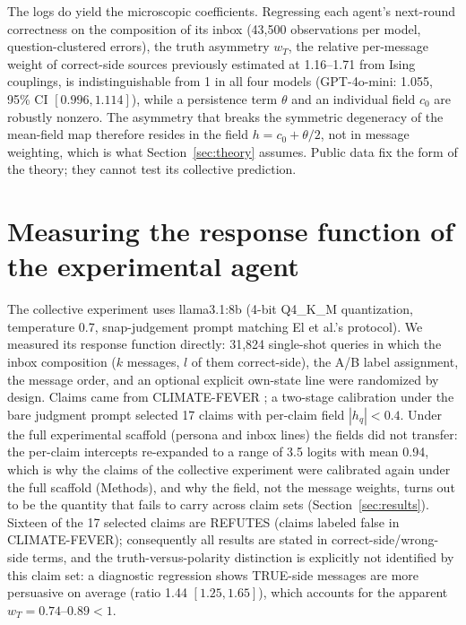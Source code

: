 \documentclass[11pt]{article}
\begin{document}
The logs do yield the microscopic coefficients. Regressing each agent's
next-round correctness on the composition of its inbox (43{,}500 observations
per model, question-clustered errors), the truth asymmetry $w_T$, the
relative per-message weight of correct-side sources previously estimated at
1.16--1.71 from Ising couplings, is indistinguishable from 1 in all four
models (GPT-4o-mini: 1.055, 95\% CI $[0.996, 1.114]$), while a persistence
term $\theta$ and an individual field $c_0$ are robustly nonzero. The
asymmetry that breaks the symmetric degeneracy of the mean-field map
therefore resides in the field $h = c_0 + \theta/2$, not in message
weighting, which is what Section~\ref{sec:theory} assumes. Public data fix
the form of the theory; they cannot test its collective prediction.

\section{Measuring the response function of the experimental agent}
\label{sec:measurement}

The collective experiment uses llama3.1:8b (4-bit Q4\_K\_M quantization, temperature 0.7,
snap-judgement prompt matching El et al.'s protocol). We measured its response
function directly: 31{,}824 single-shot queries in which the inbox composition
($k$ messages, $l$ of them correct-side), the A/B label assignment, the
message order, and an optional explicit own-state line were randomized by
design. Claims came from CLIMATE-FEVER \citep{Diggelmann2020}; a two-stage
calibration under the bare judgment prompt selected 17 claims with per-claim
field $|h_q| < 0.4$. Under the full experimental scaffold (persona and inbox
lines) the fields did not transfer: the per-claim intercepts re-expanded to a
range of 3.5 logits with mean 0.94, which is why the claims of the collective
experiment were calibrated again under the full scaffold (Methods), and why
the field, not the message weights, turns out to be the quantity that fails to
carry across claim sets (Section~\ref{sec:results}). Sixteen of the 17 selected claims are REFUTES (claims labeled false in CLIMATE-FEVER); consequently all results are stated in
correct-side/wrong-side terms, and the truth-versus-polarity distinction is
explicitly not identified by this claim set: a diagnostic regression shows
TRUE-side messages are more persuasive on average (ratio 1.44 $[1.25, 1.65]$), which accounts for the apparent $w_T = 0.74$--$0.89 < 1$.
\end{document}
